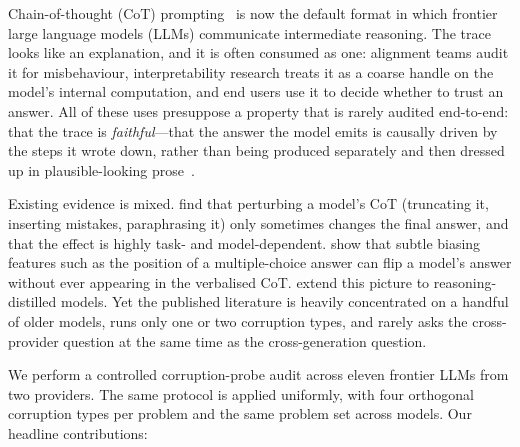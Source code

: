 \documentclass[11pt]{article}
\begin{document}
Chain-of-thought (CoT) prompting~\citep{wei2022chain} is now the default format in which frontier large language models (LLMs) communicate intermediate reasoning. The trace looks like an explanation, and it is often consumed as one: alignment teams audit it for misbehaviour, interpretability research treats it as a coarse handle on the model's internal computation, and end users use it to decide whether to trust an answer. All of these uses presuppose a property that is rarely audited end-to-end: that the trace is \emph{faithful}---that the answer the model emits is causally driven by the steps it wrote down, rather than being produced separately and then dressed up in plausible-looking prose~\citep{lanham2023measuring,turpin2023language}.

Existing evidence is mixed. \citet{lanham2023measuring} find that perturbing a model's CoT (truncating it, inserting mistakes, paraphrasing it) only sometimes changes the final answer, and that the effect is highly task- and model-dependent. \citet{turpin2023language} show that subtle biasing features such as the position of a multiple-choice answer can flip a model's answer without ever appearing in the verbalised CoT. \citet{chen2025reasoning} extend this picture to reasoning-distilled models. Yet the published literature is heavily concentrated on a handful of older models, runs only one or two corruption types, and rarely asks the cross-provider question at the same time as the cross-generation question.

We perform a controlled corruption-probe audit across eleven frontier LLMs from two providers. The same protocol is applied uniformly, with four orthogonal corruption types per problem and the same problem set across models. Our headline contributions:
\end{document}

